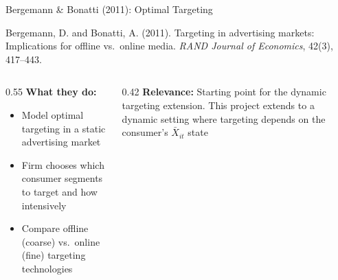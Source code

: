 \documentclass[aspectratio=169,professionalfonts]{beamer}
\newcommand{\hl}[1]{\textbf{\textcolor{UGARed}{#1}}}
\begin{document}
\begin{frame}{Bergemann \& Bonatti (2011): Optimal Targeting}
  \begin{tcolorbox}[colback=red!5!white, colframe=UGARed, title=\textbf{Citation}]
    Bergemann, D. and Bonatti, A. (2011). Targeting in advertising markets: Implications
    for offline vs.\ online media. \textit{RAND Journal of Economics}, 42(3), 417--443.
  \end{tcolorbox}
  \vspace{6pt}
  \begin{columns}[T]
    \begin{column}{0.55\textwidth}
      \hl{What they do:}
      \begin{itemize}
        \item Model optimal targeting in a static advertising market
        \item Firm chooses which consumer segments to target and how intensively
        \item Compare offline (coarse) vs.\ online (fine) targeting technologies
      \end{itemize}
    \end{column}
    \begin{column}{0.42\textwidth}
      \hl{Relevance:} Starting point for the dynamic targeting extension. This project
      extends to a dynamic setting where targeting depends on the consumer's $\bar{X}_{it}$
      state
    \end{column}
  \end{columns}
\end{frame}
\end{document}
